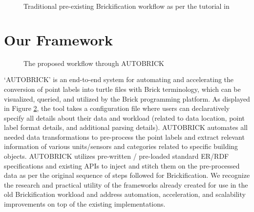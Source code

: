 \documentclass[twocolumn, switch]{article} %
\begin{document}
\begin{figure}[H]
  \centering
  \caption{ Traditional pre-existing Brickification workflow as per the
  tutorial in \cite{gtfierro225_2020} }
  \label{fig:fig1}
\end{figure}

\section{Our Framework}

\begin{figure}[H]
  \centering
  \caption{The proposed workflow through AUTOBRICK}
  \label{fig:fig2}
\end{figure}

‘AUTOBRICK’ is an end-to-end system for automating and accelerating the
conversion of point labels into turtle files with Brick terminology, which can
be visualized, queried, and utilized by the Brick programming platform. As
displayed in Figure \ref{fig:fig2}, the tool takes a configuration file where users can declaratively specify all details about their data and workload (related to data location, point label format details, and additional parsing details). AUTOBRICK automates all needed data transformations to pre-process the point labels and extract relevant information of various units/sensors and categories related to specific building objects. AUTOBRICK utilizes pre-written / pre-loaded standard ER/RDF specifications and existing APIs to inject and stitch them on the pre-processed data as per the original sequence of steps followed for Brickification. We recognize the research and practical utility of the frameworks already created for use in the old Brickification workload and address automation, acceleration, and scalability improvements on top of the existing implementations. 
\end{document}
